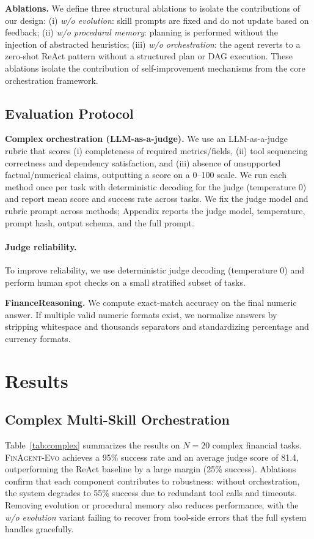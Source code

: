 \documentclass{article}
\begin{document}
\textbf{Ablations.} We define three structural ablations to isolate the contributions of our design:
(i) \emph{w/o evolution}: skill prompts are fixed and do not update based on feedback;
(ii) \emph{w/o procedural memory}: planning is performed without the injection of abstracted heuristics;
(iii) \emph{w/o orchestration}: the agent reverts to a zero-shot ReAct pattern without a structured plan or DAG execution.
These ablations isolate the contribution of self-improvement mechanisms from the core orchestration framework.

\subsection{Evaluation Protocol}
\textbf{Complex orchestration (LLM-as-a-judge).}
We use an LLM-as-a-judge rubric that scores (i) completeness of required metrics/fields, (ii) tool sequencing correctness and dependency satisfaction, and (iii) absence of unsupported factual/numerical claims, outputting a score on a 0--100 scale.
We run each method once per task with deterministic decoding for the judge (temperature 0) and report mean score and success rate across tasks. We fix the judge model and rubric prompt across methods; Appendix reports the judge model, temperature, prompt hash, output schema, and the full prompt.

\paragraph{Judge reliability.}
To improve reliability, we use deterministic judge decoding (temperature 0) and perform human spot checks on a small stratified subset of tasks.

\textbf{FinanceReasoning.}
We compute exact-match accuracy on the final numeric answer.
If multiple valid numeric formats exist, we normalize answers by stripping whitespace and thousands separators and standardizing percentage and currency formats.

\section{Results}
\subsection{Complex Multi-Skill Orchestration}
Table~\ref{tab:complex} summarizes the results on $N=20$ complex financial tasks. \textsc{FinAgent-Evo} achieves a 95\% success rate and an average judge score of 81.4, outperforming the ReAct baseline by a large margin (25\% success). Ablations confirm that each component contributes to robustness: without orchestration, the system degrades to 55\% success due to redundant tool calls and timeouts. Removing evolution or procedural memory also reduces performance, with the \emph{w/o evolution} variant failing to recover from tool-side errors that the full system handles gracefully.
\end{document}

